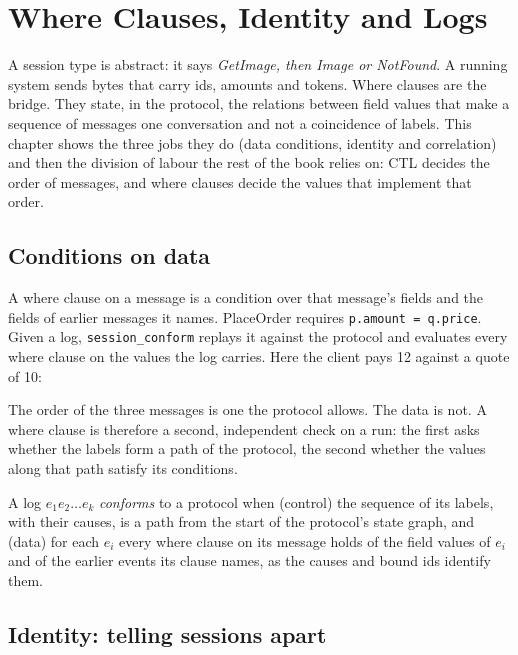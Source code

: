 \chapter{Where Clauses, Identity and Logs}\label{ch:where}

A session type is abstract: it says \emph{GetImage, then Image or NotFound}. A
running system sends bytes that carry ids, amounts and tokens. Where clauses are the
bridge. They state, in the protocol, the relations between field values that make a
sequence of messages one conversation and not a coincidence of labels. This chapter
shows the three jobs they do (data conditions, identity and correlation) and then the
division of labour the rest of the book relies on: CTL decides the order of messages,
and where clauses decide the values that implement that order.

\section{Conditions on data}

A where clause on a message is a condition over that message's fields and the fields
of earlier messages it names. PlaceOrder requires \texttt{p.amount = q.price}. Given a
log, \texttt{session\_conform} replays it against the protocol and evaluates every
where clause on the values the log carries. Here the client pays 12 against a quote
of 10:



The order of the three messages is one the protocol allows. The data is not. A
where clause is therefore a second, independent check on a run: the first asks whether
the labels form a path of the protocol, the second whether the values along that path
satisfy its conditions.

\begin{definition}[Conformance]\label{def:conform}
A log $e_1 e_2 \ldots e_k$ \emph{conforms} to a protocol when (control) the sequence of
its labels, with their causes, is a path from the start of the protocol's state graph,
and (data) for each $e_i$ every where clause on its message holds of the field values
of $e_i$ and of the earlier events its clause names, as the causes and bound ids
identify them.
\end{definition}

\section{Identity: telling sessions apart}


